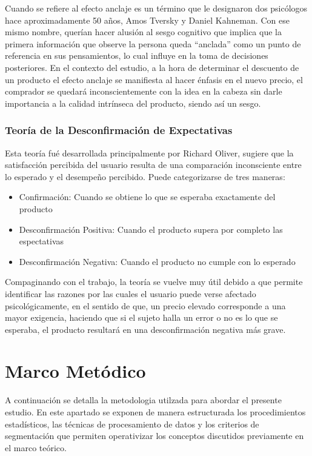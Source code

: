 \documentclass[oneside,11pt]{Latex/Classes/PhDthesisPSnPDF}
\begin{document}
Cuando se refiere al efecto anclaje es un término que le designaron dos
psicólogos hace aproximadamente 50 años, Amos Tversky y Daniel Kahneman.
Con ese mismo nombre, querían hacer alusión al sesgo cognitivo que
implica que la primera información que observe la persona queda
``anclada'' como un punto de referencia en sus pensamientos, lo cual
influye en la toma de decisiones posteriores. En el contexto del
estudio, a la hora de determinar el descuento de un producto el efecto
anclaje se manifiesta al hacer énfasis en el nuevo precio, el comprador
se quedará inconscientemente con la idea en la cabeza sin darle
importancia a la calidad intrínseca del producto, siendo así un sesgo.

\subsection{Teoría de la Desconfirmación de Expectativas}

Esta teoría fué desarrollada principalmente por Richard Oliver, sugiere
que la satisfacción percibida del usuario resulta de una comparación
inconsciente entre lo esperado y el desempeño percibido. Puede
categorizarse de tres maneras:

\begin{itemize}
  \item{Confirmación: Cuando se obtiene lo que se esperaba exactamente del producto}
  \item{Desconfirmación Positiva: Cuando el producto supera por completo las espectativas}
   \item{Desconfirmación Negativa: Cuando el producto no cumple con lo esperado}
\end{itemize}

\hfill\break
Compaginando con el trabajo, la teoría se vuelve muy útil debido a que
permite identificar las razones por las cuales el usuario puede verse
afectado psicológicamente, en el sentido de que, un precio elevado
corresponde a una mayor exigencia, haciendo que si el sujeto halla un
error o no es lo que se esperaba, el producto resultará en una
desconfirmación negativa más grave.

\chapter{Marco Metódico}

A continuación se detalla la metodologia utilzada para abordar el
presente estudio. En este apartado se exponen de manera estructurada los
procedimientos estadísticos, las técnicas de procesamiento de datos y
los criterios de segmentación que permiten operativizar los conceptos
discutidos previamente en el marco teórico.
\end{document}
